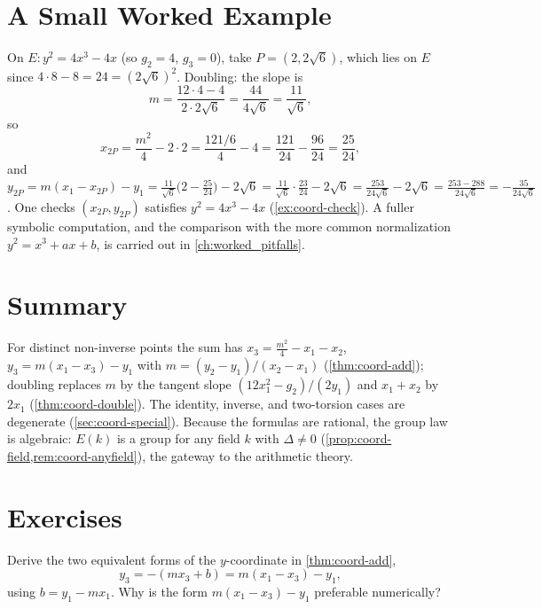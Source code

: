 \section{A Small Worked Example}
\label{sec:coord-example}

On \(E : y^2 = 4x^3 - 4x\) (so \(g_2 = 4\), \(g_3 = 0\)), take
\(P = (2, 2\sqrt 6)\), which lies on \(E\) since \(4\cdot 8 - 8 = 24 = (2\sqrt6)^2\).
Doubling: the slope is
\[
  m = \frac{12 \cdot 4 - 4}{2 \cdot 2\sqrt 6} = \frac{44}{4\sqrt 6} = \frac{11}{\sqrt 6},
\]
so
\[
  x_{2P} = \frac{m^2}{4} - 2\cdot 2 = \frac{121/6}{4} - 4 = \frac{121}{24} - \frac{96}{24}
  = \frac{25}{24},
\]
and \(y_{2P} = m(x_1 - x_{2P}) - y_1 = \tfrac{11}{\sqrt6}\bigl(2 - \tfrac{25}{24}\bigr)
- 2\sqrt6 = \tfrac{11}{\sqrt6}\cdot\tfrac{23}{24} - 2\sqrt6
= \tfrac{253}{24\sqrt6} - 2\sqrt6 = \tfrac{253 - 288}{24\sqrt6} = -\tfrac{35}{24\sqrt6}\).
One checks \((x_{2P}, y_{2P})\) satisfies \(y^2 = 4x^3 - 4x\)
(\cref{ex:coord-check}). A fuller symbolic computation, and the comparison with the
more common normalization \(y^2 = x^3 + ax + b\), is carried out in
\cref{ch:worked_pitfalls}.

\section{Summary}
\label{sec:coord-summary}

For distinct non-inverse points the sum has \(x_3 = \tfrac{m^2}{4} - x_1 - x_2\),
\(y_3 = m(x_1 - x_3) - y_1\) with \(m = (y_2-y_1)/(x_2-x_1)\)
(\cref{thm:coord-add}); doubling replaces \(m\) by the tangent slope
\((12x_1^2 - g_2)/(2y_1)\) and \(x_1 + x_2\) by \(2x_1\)
(\cref{thm:coord-double}). The identity, inverse, and two-torsion cases are
degenerate (\cref{sec:coord-special}). Because the formulas are rational, the
group law is algebraic: \(E(k)\) is a group for any field \(k\) with
\(\Delta \ne 0\) (\cref{prop:coord-field,rem:coord-anyfield}), the gateway to the
arithmetic theory.

\section*{Exercises}

\begin{exercise}
\label{ex:coord-yform}
Derive the two equivalent forms of the \(y\)-coordinate in \cref{thm:coord-add},
\[
  y_3 = -(m x_3 + b) = m(x_1 - x_3) - y_1,
\]
using \(b = y_1 - m x_1\). Why is the form \(m(x_1 - x_3) - y_1\) preferable
numerically?
\end{exercise}

